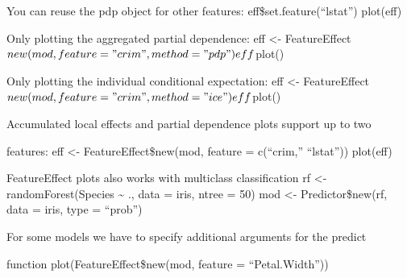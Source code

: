 \documentclass[
  ignorenonframetext,
]{beamer}
\begin{document}
\begin{frame}{You can reuse the pdp object for other features:}
\protect\hypertarget{you-can-reuse-the-pdp-object-for-other-features}{}
eff\$set.feature(``lstat'') plot(eff)
\end{frame}

\begin{frame}{Only plotting the aggregated partial dependence:}
\protect\hypertarget{only-plotting-the-aggregated-partial-dependence}{}
eff \textless-
FeatureEffect\(new(mod, feature = "crim", method = "pdp") eff\)plot()
\end{frame}

\begin{frame}{Only plotting the individual conditional expectation:}
\protect\hypertarget{only-plotting-the-individual-conditional-expectation}{}
eff \textless-
FeatureEffect\(new(mod, feature = "crim", method = "ice") eff\)plot()
\end{frame}

\begin{frame}{Accumulated local effects and partial dependence plots
support up to two}
\protect\hypertarget{accumulated-local-effects-and-partial-dependence-plots-support-up-to-two}{}
\end{frame}

\begin{frame}{features:}
\protect\hypertarget{features}{}
eff \textless- FeatureEffect\$new(mod, feature = c(``crim,'' ``lstat''))
plot(eff)
\end{frame}

\begin{frame}{FeatureEffect plots also works with multiclass
classification}
\protect\hypertarget{featureeffect-plots-also-works-with-multiclass-classification}{}
rf \textless- randomForest(Species \textasciitilde{} ., data = iris,
ntree = 50) mod \textless- Predictor\$new(rf, data = iris, type =
``prob'')
\end{frame}

\begin{frame}{For some models we have to specify additional arguments
for the predict}
\protect\hypertarget{for-some-models-we-have-to-specify-additional-arguments-for-the-predict}{}
\end{frame}

\begin{frame}{function}
\protect\hypertarget{function}{}
plot(FeatureEffect\$new(mod, feature = ``Petal.Width''))
\end{frame}
\end{document}
